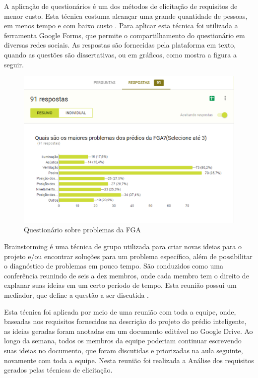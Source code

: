 A aplicação de questionários é um dos métodos de elicitação de requisitos de menor custo. Esta técnica costuma alcançar uma grande quantidade de pessoas, em menos  tempo e com baixo custo \cite{gunda2008}. Para aplicar esta técnica foi utilizada a ferramenta Google Forms, que permite o compartilhamento do questionário em diversas redes sociais. As respostas são fornecidas pela plataforma em texto, quando as questões são dissertativas, ou em gráficos, como mostra a figura a seguir.

\begin{figure}[h]
  \caption{Questionário sobre problemas da FGA}
  \centering
    \includegraphics[width=1.0\textwidth]{figuras/pesq.eps}
\end{figure}

Brainstorming é uma técnica de grupo utilizada para criar novas ideias para o projeto e/ou encontrar soluções para um problema específico, além de possibilitar o diagnóstico de problemas em pouco tempo. São conduzidos como uma conferência reunindo de seis a dez membros, onde cada membro tem o direito de explanar suas ideias em um certo período de tempo. Esta reunião possui um mediador, que define a questão a ser discutida \cite{gunda2008}.

Esta técnica foi aplicada por meio de uma reunião com toda a equipe, onde, baseadas nos requisitos fornecidos na descrição do projeto do prédio inteligente, as ideias geradas foram anotadas em um documento editável no Google Drive. Ao longo da semana, todos os membros da equipe poderiam continuar escrevendo suas ideias no documento, que foram discutidas e priorizadas na aula seguinte, novamente com toda a equipe. Nesta reunião foi realizada a Análise dos requisitos gerados pelas técnicas de elicitação.

